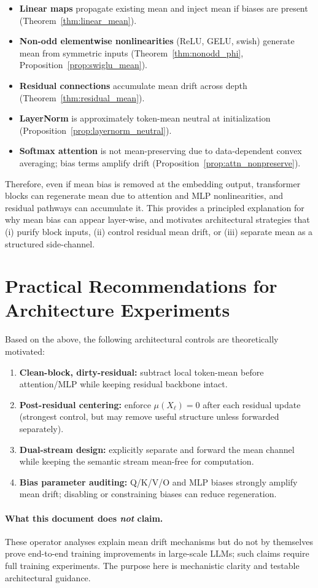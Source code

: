 \begin{itemize}
\item \textbf{Linear maps} propagate existing mean and inject mean if biases are present (Theorem~\ref{thm:linear_mean}).
\item \textbf{Non-odd elementwise nonlinearities} (ReLU, GELU, swish) generate mean from symmetric inputs (Theorem~\ref{thm:nonodd_phi}, Proposition~\ref{prop:swiglu_mean}).
\item \textbf{Residual connections} accumulate mean drift across depth (Theorem~\ref{thm:residual_mean}).
\item \textbf{LayerNorm} is approximately token-mean neutral at initialization (Proposition~\ref{prop:layernorm_neutral}).
\item \textbf{Softmax attention} is not mean-preserving due to data-dependent convex averaging; bias terms amplify drift (Proposition~\ref{prop:attn_nonpreserve}).
\end{itemize}

Therefore, even if mean bias is removed at the embedding output, transformer blocks can regenerate mean due to attention and MLP nonlinearities, and residual pathways can accumulate it.
This provides a principled explanation for why mean bias can appear layer-wise, and motivates architectural strategies that (i) purify block inputs, (ii) control residual mean drift, or (iii) separate mean as a structured side-channel.

\section{Practical Recommendations for Architecture Experiments}

Based on the above, the following architectural controls are theoretically motivated:

\begin{enumerate}
\item \textbf{Clean-block, dirty-residual:} subtract local token-mean before attention/MLP while keeping residual backbone intact.
\item \textbf{Post-residual centering:} enforce $\mu(X_\ell)=0$ after each residual update (strongest control, but may remove useful structure unless forwarded separately).
\item \textbf{Dual-stream design:} explicitly separate and forward the mean channel while keeping the semantic stream mean-free for computation.
\item \textbf{Bias parameter auditing:} Q/K/V/O and MLP biases strongly amplify mean drift; disabling or constraining biases can reduce regeneration.
\end{enumerate}

\paragraph{What this document does \emph{not} claim.}
These operator analyses explain mean drift mechanisms but do not by themselves prove end-to-end training improvements in large-scale LLMs; such claims require full training experiments. The purpose here is mechanistic clarity and testable architectural guidance.
